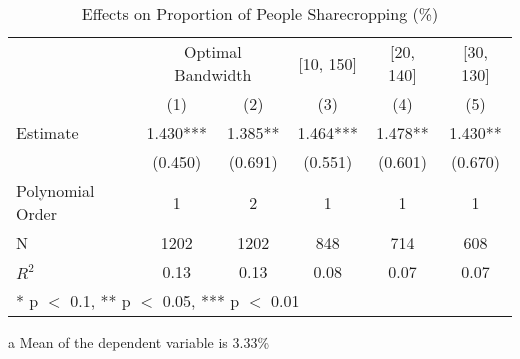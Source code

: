 \begin{table}[!h]

\caption{Effects on Proportion of People Sharecropping (\%) \label{tab:rdd_sharecropping}}
\centering
\begin{threeparttable}
\begin{tabular}[t]{lccccc}
\toprule
\multicolumn{1}{c}{} & \multicolumn{2}{c}{Optimal Bandwidth} & \multicolumn{1}{c}{[10, 150]} & \multicolumn{1}{c}{[20, 140]} & \multicolumn{1}{c}{[30, 130]} \\
\cmidrule(l{3pt}r{3pt}){2-3} \cmidrule(l{3pt}r{3pt}){4-4} \cmidrule(l{3pt}r{3pt}){5-5} \cmidrule(l{3pt}r{3pt}){6-6}
  & (1) & (2) & (3) & (4) & (5)\\
\midrule
Estimate & \num{1.430}*** & \num{1.385}** & \num{1.464}*** & \num{1.478}** & \num{1.430}**\\
 & (\num{0.450}) & (\num{0.691}) & (\num{0.551}) & (\num{0.601}) & (\num{0.670})\\

\midrule
Polynomial Order & 1 & 2 & 1 & 1 & 1\\
N & \num{1202} & \num{1202} & \num{848} & \num{714} & \num{608}\\
$R^2$ & \num{0.13} & \num{0.13} & \num{0.08} & \num{0.07} & \num{0.07}\\
\bottomrule
\multicolumn{6}{l}{\rule{0pt}{1em}* p $<$ 0.1, ** p $<$ 0.05, *** p $<$ 0.01}\\
\end{tabular}
\begin{tablenotes}
\item[a] Mean of the dependent variable is 3.33\%
\end{tablenotes}
\end{threeparttable}
\end{table}
